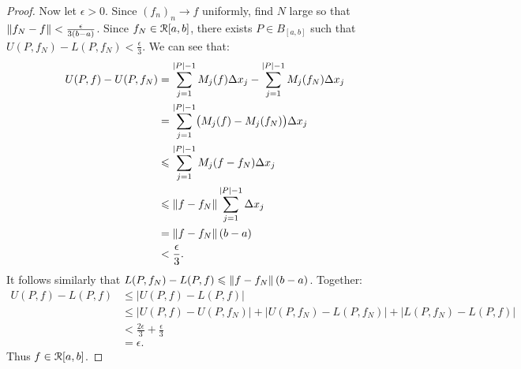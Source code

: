 \documentclass[10pt,twoside,openany]{memoir}
\begin{document}
\begin{proof}
            Now let $\epsilon > 0$. Since $(f_n)_n \rightarrow f$ uniformly, find $N$ large so that $\left\lVert f_N - f \right\rVert < \frac{\epsilon}{3(b-a)}$. Since $f_N \in \mathcal{R}[a,b]$, there exists $P \in B_{[a,b]}$ such that $U(P,f_N) - L(P,f_N) < \frac{\epsilon}{3}$. We can see that:
                \begin{equation*}
                \begin{split}
                    U(P,f) - U(P,f_N)
                    & = \sum_{j = 1}^{|P| - 1}M_j(f)\Delta x_j - \sum_{j = 1}^{|P| - 1}M_j(f_N)\Delta x_j \\
                    & = \sum_{j = 1}^{|P| - 1} \bigl(M_j(f) - M_j(f_N)\bigr)\Delta x_j \\
                    & \leqslant \sum_{j = 1}^{|P| - 1} M_j(f - f_N)\Delta x_j \\
                    & \leqslant \left\lVert f - f_N \right\rVert\sum_{j = 1}^{|P| - 1} \Delta x_j \\
                    & = \left\lVert f - f_N \right\rVert(b-a) \\
                    & < \frac{\epsilon}{3}.
                \end{split}
                \end{equation*}
            It follows similarly that $L(P,f_N) - L(P,f) \leqslant \left\lVert f - f_N \right\rVert(b-a)$. Together:
                \begin{equation*}
                \begin{split}
                    U(P,f) - L(P,f)
                    & \leq |U(P,f) - L(P,f)| \\
                    & \leq |U(P,f) - U(P,f_N)| + |U(P,f_N) - L(P,f_N)| + |L(P,f_N) - L(P,f)| \\
                    & < \frac{2\epsilon}{3} + \frac{\epsilon}{3} \\
                    & = \epsilon.
                \end{split}
                \end{equation*}
            Thus $f \in \mathcal{R}[a,b]$.
        \end{proof}
\end{document}
